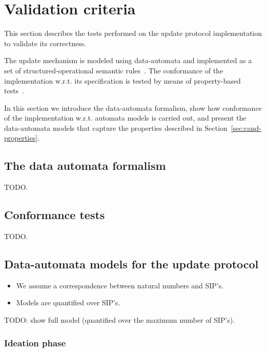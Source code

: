 
\section{Validation criteria}
\label{sec:validation-criteria}

This section describes the tests performed on the update protocol implementation
to validate its correctness.

The update mechanism is modeled using data-automata and implemented as a set of
structured-operational semantic rules~\cite{7436dacbd7664737925923f0657fdc07,
  quickcheck-state-machine}. The conformance of the implementation w.r.t. its
specification is tested by means of property-based
tests~\cite{10.1145/1988042.1988046}.

In this section we introduce the data-automata formalism, show how conformance
of the implementation w.r.t. automata models is carried out, and present the
data-automata models that capture the properties described in
Section~\ref{sec:cand-properties}.

\subsection{The data automata formalism}
\label{sec:the-data-automata-formalism}

TODO.

\subsection{Conformance tests}
\label{sec:conformance-tests}

TODO.

\subsection{Data-automata models for the update protocol}
\label{sec:automata-models-update-protocol}


\begin{itemize}
\item We assume a correspondence between natural numbers and SIP's.
\item Models are quantified over SIP's.
\end{itemize}

TODO: show full model (quantified over the maximum number of SIP's).

\subsubsection{Ideation phase}
\label{sec:validation-ideation-phase}

